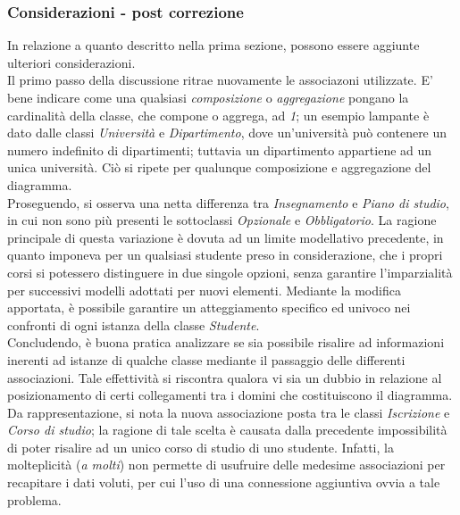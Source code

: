 \documentclass{article}
\begin{document}
\subsubsection*{Considerazioni - post correzione}
In relazione a quanto descritto nella prima sezione, possono essere aggiunte ulteriori considerazioni.\vspace*{14pt}\\
Il primo passo della discussione ritrae nuovamente le associazoni utilizzate. E' bene indicare come una qualsiasi \textit{composizione} o \textit{aggregazione} pongano la cardinalità della classe, che compone o aggrega, ad \textit{1}; un esempio lampante è dato dalle classi \textit{Università} e \textit{Dipartimento}, dove un'università può contenere un numero indefinito di dipartimenti; tuttavia un dipartimento appartiene ad un unica università. Ciò si ripete per qualunque composizione e aggregazione del diagramma.\vspace*{14pt}\\
Proseguendo, si osserva una netta differenza tra \textit{Insegnamento} e \textit{Piano di studio}, in cui non sono più presenti le sottoclassi \textit{Opzionale} e \textit{Obbligatorio}. La ragione principale di questa variazione è dovuta ad un limite modellativo precedente, in quanto imponeva per un qualsiasi studente preso in considerazione, che i propri corsi si potessero distinguere in due singole opzioni, senza garantire l'imparzialità per successivi modelli adottati per nuovi elementi. Mediante la modifica apportata, è possibile garantire un atteggiamento specifico ed univoco nei confronti di ogni istanza della classe \textit{Studente}.\vspace*{14pt}\\
Concludendo, è buona pratica analizzare se sia possibile risalire ad informazioni inerenti ad istanze di qualche classe mediante il passaggio delle differenti associazioni. Tale effettività si riscontra qualora vi sia un dubbio in relazione al posizionamento di certi collegamenti tra i domini che costituiscono il diagramma. Da rappresentazione, si nota la nuova associazione posta tra le classi \textit{Iscrizione} e \textit{Corso di studio}; la ragione di tale scelta è causata dalla precedente impossibilità di poter risalire ad un unico corso di studio di uno studente. Infatti, la molteplicità (\textit{a molti}) non permette di usufruire delle medesime associazioni per recapitare i dati voluti, per cui l'uso di una connessione aggiuntiva ovvia a tale problema.
\end{document}
